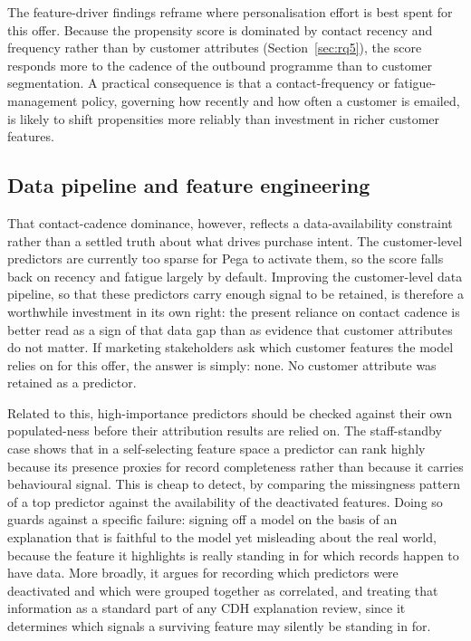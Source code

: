\documentclass[oneside]{memoir} %
\begin{document}
The feature-driver findings reframe where personalisation effort is best spent for this offer. Because the propensity score is dominated by contact recency and frequency rather than by customer attributes (Section~\ref{sec:rq5}), the score responds more to the cadence of the outbound programme than to customer segmentation. A practical consequence is that a contact-frequency or fatigue-management policy, governing how recently and how often a customer is emailed, is likely to shift propensities more reliably than investment in richer customer features.

\subsection*{Data pipeline and feature engineering}

That contact-cadence dominance, however, reflects a data-availability constraint rather than a settled truth about what drives purchase intent. The customer-level predictors are currently too sparse for Pega to activate them, so the score falls back on recency and fatigue largely by default. Improving the customer-level data pipeline, so that these predictors carry enough signal to be retained, is therefore a worthwhile investment in its own right: the present reliance on contact cadence is better read as a sign of that data gap than as evidence that customer attributes do not matter. If marketing stakeholders ask which customer features the model relies on for this offer, the answer is simply: none. No customer attribute was retained as a predictor.

Related to this, high-importance predictors should be checked against their own populated-ness before their attribution results are relied on. The staff-standby case shows that in a self-selecting feature space a predictor can rank highly because its presence proxies for record completeness rather than because it carries behavioural signal. This is cheap to detect, by comparing the missingness pattern of a top predictor against the availability of the deactivated features. Doing so guards against a specific failure: signing off a model on the basis of an explanation that is faithful to the model yet misleading about the real world, because the feature it highlights is really standing in for which records happen to have data. More broadly, it argues for recording which predictors were deactivated and which were grouped together as correlated, and treating that information as a standard part of any CDH explanation review, since it determines which signals a surviving feature may silently be standing in for.
\end{document}

